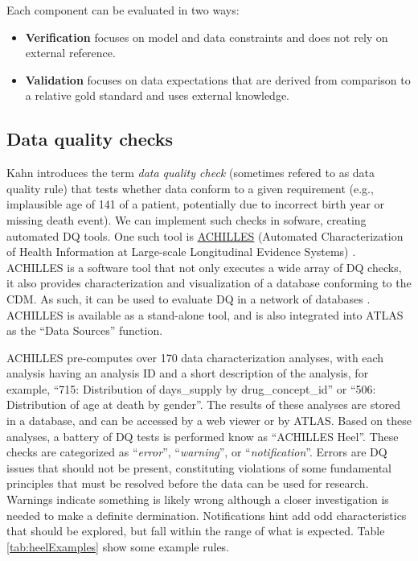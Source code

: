\documentclass[11pt]{book}
\providecommand{\tightlist}{%
  \setlength{\itemsep}{0pt}\setlength{\parskip}{0pt}}
\theoremstyle{definition}
\theoremstyle{definition}
\theoremstyle{definition}
\theoremstyle{remark}
\begin{document}
Each component can be evaluated in two ways:

\begin{itemize}
\tightlist
\item
  \textbf{Verification} focuses on model and data constraints and does not rely on external reference.
\item
  \textbf{Validation} focuses on data expectations that are derived from comparison to a relative gold standard and uses external knowledge.
\end{itemize}

 

\hypertarget{data-quality-checks}{%
\subsection{Data quality checks}\label{data-quality-checks}}

Kahn introduces the term \emph{data quality check} (sometimes refered to as data quality rule) that tests whether data conform to a given requirement (e.g., implausible age of 141 of a patient, potentially due to incorrect birth year or missing death event). We can implement such checks in sofware, creating automated DQ tools. One such tool is \href{https://github.com/OHDSI/Achilles}{ACHILLES} (Automated Characterization of Health Information at Large-scale Longitudinal Evidence Systems) \citep{huser_methods_2018}. ACHILLES is a software tool that not only executes a wide array of DQ checks, it also provides characterization and visualization of a database conforming to the CDM. As such, it can be used to evaluate DQ in a network of databases \citep{huser_multisite_2016}. ACHILLES is available as a stand-alone tool, and is also integrated into ATLAS as the ``Data Sources'' function.  

ACHILLES pre-computes over 170 data characterization analyses, with each analysis having an analysis ID and a short description of the analysis, for example, ``715: Distribution of days\_supply by drug\_concept\_id'' or ``506: Distribution of age at death by gender''. The results of these analyses are stored in a database, and can be accessed by a web viewer or by ATLAS. Based on these analyses, a battery of DQ tests is performed know as ``ACHILLES Heel''. These checks are categorized as ``\emph{error}'', ``\emph{warning}'', or ``\emph{notification}''. Errors are DQ issues that should not be present, constituting violations of some fundamental principles that must be resolved before the data can be used for research. Warnings indicate something is likely wrong although a closer investigation is needed to make a definite dermination. Notifications hint add odd characteristics that should be explored, but fall within the range of what is expected. Table \ref{tab:heelExamples} show some example rules. 
\end{document}
